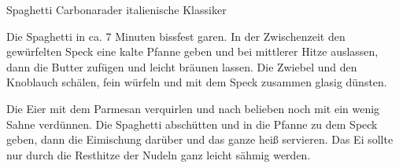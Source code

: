 \begin{recipe}{Spaghetti Carbonara}{der italienische Klassiker}
  \inglist
  
  \steps
  Die Spaghetti in ca. 7 Minuten bissfest garen. In der Zwischenzeit den gewürfelten Speck
  eine kalte Pfanne geben und bei mittlerer Hitze auslassen, dann die Butter zufügen und leicht
  bräunen lassen. Die Zwiebel und den Knoblauch schälen, fein würfeln und mit dem Speck
  zusammen glasig dünsten.

  Die Eier mit dem Parmesan verquirlen und nach belieben noch mit ein wenig Sahne
  verdünnen. Die Spaghetti abschütten und in die Pfanne zu dem Speck geben, dann die
  Eimischung darüber und das ganze heiß servieren. Das Ei sollte nur durch die Resthitze
  der Nudeln ganz leicht sähmig werden.
\end{recipe}

